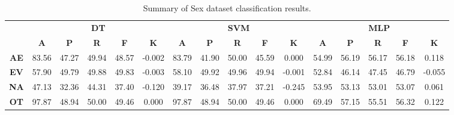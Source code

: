 \begin{landscape}
\begin{table}[htbp]
\footnotesize
\centering
\caption{Summary of Sex dataset classification results.}
\label{tab:base_female}
\begin{tabular}{|c|c|c|c|c|c|c|c|c|c|c|c|c|c|c|c|}
\hline
\multirow{2}{*}{}	& \multicolumn{5}{c|}{\textbf{DT}}												& \multicolumn{5}{c|}{\textbf{SVM}}												& \multicolumn{5}{c|}{\textbf{MLP}}												\\ \cline{2-16} 
					& \textbf{A}	& \textbf{P}	& \textbf{R}	& \textbf{F}	& \textbf{K}	& \textbf{A}	& \textbf{P}	& \textbf{R}	& \textbf{F}	& \textbf{K}	& \textbf{A}	& \textbf{P}	& \textbf{R}	& \textbf{F}	& \textbf{K}	\\ \hline
\textbf{AE}			& 83.56			& 47.27			& 49.94			& 48.57			& -0.002			& 83.79			& 41.90			& 50.00			& 45.59			& 0.000			& 54.99			& 56.19			& 56.17			& 56.18			& 0.118			\\ \hline
\textbf{EV}			& 57.90			& 49.79			& 49.88			& 49.83			& -0.003			& 58.10			& 49.92			& 49.96			& 49.94			& -0.001			& 52.84			& 46.14			& 47.45			& 46.79			& -0.055			\\ \hline
\textbf{NA}			& 47.13			& 32.36			& 44.31			& 37.40			& -0.120			& 39.17			& 36.48			& 37.97			& 37.21			& -0.245			& 53.95			& 53.13			& 53.01			& 53.07			& 0.061			\\ \hline
\textbf{OT}			& 97.87			& 48.94			& 50.00			& 49.46			& 0.000			& 97.87			& 48.94			& 50.00			& 49.46			& 0.000			& 69.49			& 57.15			& 55.51			& 56.32			& 0.122			\\ \hline
\end{tabular}
\end{table}
\end{landscape}